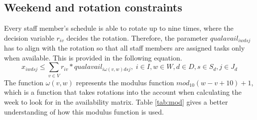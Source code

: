 \subsection{Weekend and rotation constraints} \label{section:weekend_rot_constraints}
Every staff member's schedule is able to rotate up to nine times, where the decision variable $r_{iv}$ decides the rotation. Therefore, the parameter $qualavail_{iwdsj}$ has to align with the rotation so that all staff members are assigned tasks only when available. This is provided in the following equation.
\begin{equation} \label{constr:qualavail}
x_{iwdsj} \leq \sum_{v \in V} r_{iv}*qualavail_{i\omega(v,w)dsj}, \;   i \in I, w \in W, d \in D, s \in S_d, j \in J_d
\end{equation}
The function $\omega(v,w)$ represents the modulus function $mod_{10}(w-v+10)+1$, which is a function that takes rotations into the account when calculating the week to look for in the availability matrix. Table \ref{tab:mod} gives a better understanding of how this modulus function is used.

